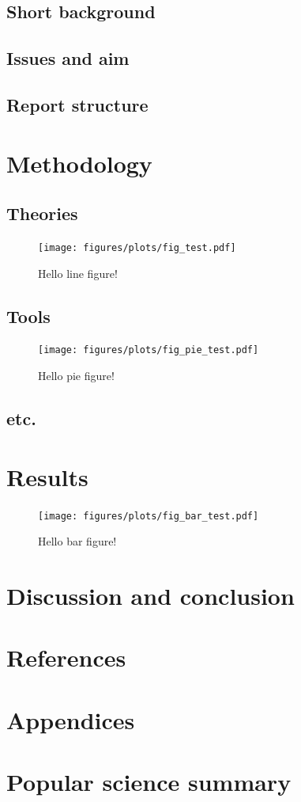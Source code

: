 \documentclass[a4paper,11pt]{article}
\begin{document}
  \subsection{Short background}
  \subsection{Issues and aim}
  \subsection{Report structure}
\section{Methodology}
  \subsection{Theories}
    \begin{figure}[H]
      \begin{center}
        \texttt{[image: figures/plots/fig\_test.pdf]}
        \caption{Hello line figure!}
      \end{center}
    \end{figure}
  \subsection{Tools}
    \begin{figure}[H]
      \begin{center}
        \vspace{-0.3cm}
        \texttt{[image: figures/plots/fig\_pie\_test.pdf]}
        \vspace{-0.5cm}
        \caption{Hello pie figure!}
      \end{center}
    \end{figure}
  \subsection{etc.}
\section{Results}
    \begin{figure}[H]
      \begin{center}
        \texttt{[image: figures/plots/fig\_bar\_test.pdf]}
        \caption{Hello bar figure!}
      \end{center}
    \end{figure}
\section{Discussion and conclusion}
\section{References}
\section{Appendices}
\section{Popular science summary}

\printbibliography
\end{document}
